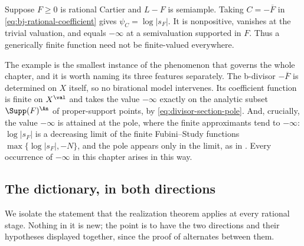 \begin{example}
\label{ex:bj-fixed-divisor-coefficient}
Suppose $F\ge0$ is rational Cartier and $L-F$ is semiample.  Taking
$C=-\overline F$ in \eqref{eq:bj-rational-coefficient} gives
$\psi_C=\log|s_F|$.  It is nonpositive, vanishes at the trivial
valuation, and equals $-\infty$ at a semivaluation supported in $F$.
Thus a generically finite function need not be finite-valued everywhere.
\end{example}

The example is the smallest instance of the phenomenon that governs the
whole chapter, and it is worth naming its three features separately.  The
b-divisor $-\overline F$ is determined on $X$ itself, so no birational
model intervenes.  Its coefficient function is finite on $X^{\val}$ and
takes the value $-\infty$ exactly on the analytic subset
$\Supp(F)^{\An}$ of proper-support points, by
\eqref{eq:divisor-section-pole}.  And, crucially, the value $-\infty$ is
attained at the pole, where the finite approximants tend to $-\infty$:
$\log|s_F|$ is a decreasing limit of the
finite Fubini--Study functions $\max\{\log|s_F|,-N\}$, and the pole
appears only in the limit, as in .  Every
occurrence of $-\infty$ in this chapter arises in this way.

\subsection{The dictionary, in both directions}
\label{sec:ch38-dictionary-fs}

We isolate the statement that the realization theorem applies at every
rational stage.  Nothing in it is new; the point is to have the two
directions and their hypotheses displayed together, since the proof of
 alternates between them.


